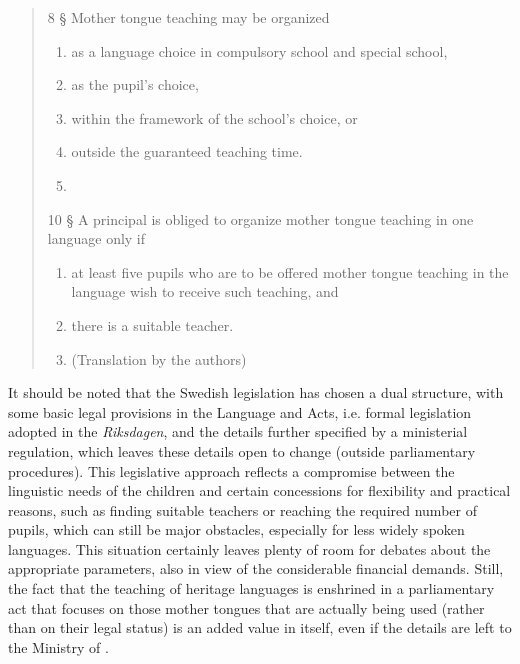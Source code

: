 \documentclass[output=paper,colorlinks,citecolor=brown]{langscibook}
\begin{document}
\begin{quote}
    8 § Mother tongue teaching may be organized
    \begin{enumerate}
        \item as a language choice in compulsory school and special school,
        \item as the pupil's choice,
        \item within the framework of the school's choice, or
        \item outside the guaranteed teaching time.
        \item[] […]
    \end{enumerate}
    10 § A principal is obliged to organize mother tongue teaching in one language only if
    \begin{enumerate}
        \item at least five pupils who are to be offered mother tongue teaching in the language wish to receive such teaching, and
        \item there is a suitable teacher.
        \item[] […] (Translation by the authors)
    \end{enumerate}
\end{quote}

It should be noted that the Swedish legislation has chosen a dual structure, with some basic legal provisions in the Language and  Acts, i.e. formal legislation adopted in the \textit{Riksdagen}, and the details further specified by a ministerial regulation, which leaves these details open to change (outside parliamentary procedures). This legislative approach reflects a compromise between the linguistic needs of the children and certain concessions for flexibility and practical reasons, such as finding suitable teachers or reaching the required number of pupils, which can still be major obstacles, especially for less widely spoken languages. This situation certainly leaves plenty of room for debates about the appropriate parameters, also in view of the considerable financial demands. Still, the fact that the teaching of heritage languages is enshrined in a parliamentary act that focuses on those mother tongues that are actually being used (rather than on their legal status) is an added value in itself, even if the details are left to the Ministry of  \citep[5--7, 12]{hofmann_malkmus2022a}.
\end{document}
